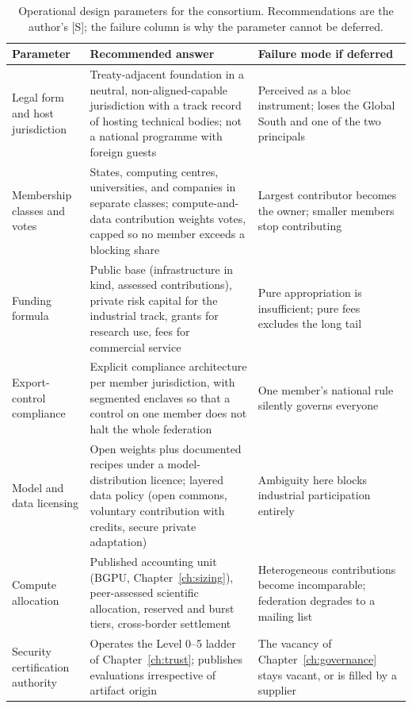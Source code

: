 \begin{table}[htbp]
  \centering
  \scriptsize
  \caption{Operational design parameters for the consortium. Recommendations are the author's [S]; the failure column is why the parameter cannot be deferred.}
  \label{tab:consortium-spec}
  \begin{tabular}{p{28mm}p{56mm}p{52mm}}
    \toprule
    Parameter & Recommended answer & Failure mode if deferred \\
    \midrule
    Legal form and host jurisdiction & Treaty-adjacent foundation in a neutral, non-aligned-capable jurisdiction with a track record of hosting technical bodies; not a national programme with foreign guests & Perceived as a bloc instrument; loses the Global South and one of the two principals \\
    \addlinespace
    Membership classes and votes & States, computing centres, universities, and companies in separate classes; compute-and-data contribution weights votes, capped so no member exceeds a blocking share & Largest contributor becomes the owner; smaller members stop contributing \\
    \addlinespace
    Funding formula & Public base (infrastructure in kind, assessed contributions), private risk capital for the industrial track, grants for research use, fees for commercial service & Pure appropriation is insufficient; pure fees excludes the long tail \\
    \addlinespace
    Export-control compliance & Explicit compliance architecture per member jurisdiction, with segmented enclaves so that a control on one member does not halt the whole federation & One member's national rule silently governs everyone \\
    \addlinespace
    Model and data licensing & Open weights plus documented recipes under a model-distribution licence; layered data policy (open commons, voluntary contribution with credits, secure private adaptation) & Ambiguity here blocks industrial participation entirely \\
    \addlinespace
    Compute allocation & Published accounting unit (BGPU, Chapter~\ref{ch:sizing}), peer-assessed scientific allocation, reserved and burst tiers, cross-border settlement & Heterogeneous contributions become incomparable; federation degrades to a mailing list \\
    \addlinespace
    Security certification authority & Operates the Level 0--5 ladder of Chapter~\ref{ch:trust}; publishes evaluations irrespective of artifact origin & The vacancy of Chapter~\ref{ch:governance} stays vacant, or is filled by a supplier \\

\end{tabular}
\end{table}
